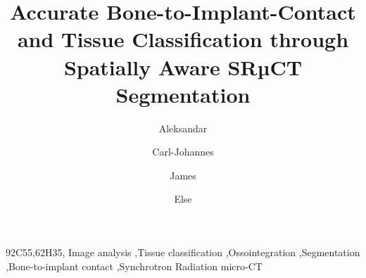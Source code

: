 \documentclass[times,twocolumn,final]{elsarticle}
\begin{document}

\begin{frontmatter}

\title{
   Accurate Bone-to-Implant-Contact and Tissue Classification through Spatially Aware SRµCT Segmentation
}%

\author[1]{Aleksandar }
\author[1]{Carl-Johannes }
\author[1,2]{James }
\author[3]{Else }

\address[1]{University of Copenhagen, Niels Bohr Institute}
\address[2]{University of Copenhagen, Department of Computer Science}
\address[3]{University of Southern Denmark}



\begin{abstract}
  
\end{abstract}

\begin{keyword}
\MSC 92C55\sep 62H35\sep
\KWD Image analysis \sep Tissue classification \sep Ossointegration \sep Segmentation \sep Bone-to-implant contact \sep Synchrotron Radiation micro-CT
\end{keyword}

\end{frontmatter}















\end{document}
